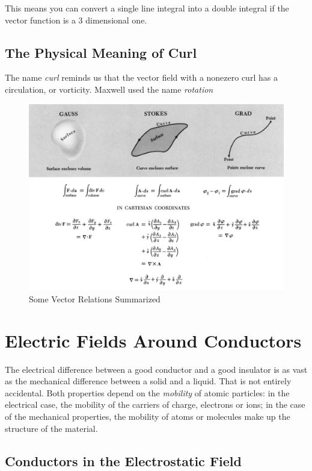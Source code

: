 \documentclass[svgnames]{article}
\begin{document}
This means you can convert a single line integral into a double integral if the
vector function is a 3 dimensional one. 

\subsection{The Physical Meaning of Curl}


The name \textit{curl} reminds us that the vector field with a nonezero curl
has a circulation, or vorticity. Maxwell used the name \textit{rotation}\\

\begin{figure}
  \centering
  \includegraphics[width = 15cm]{screenshot 5.png}
  \caption{Some Vector Relations Summarized}
\end{figure}

\section{Electric Fields Around Conductors}

The electrical difference between a good conductor and a good insulator is as
vast as the mechanical difference between a solid and a liquid. That is not
entirely accidental. Both properties depend on the \textit{mobility} of atomic
particles: in the electrical case, the mobility of the carriers of charge,
electrons or ions; in the case of the mechanical properties, the mobility of
atoms or molecules make up the structure of the material. 

\subsection{Conductors in the Electrostatic Field}
\end{document}
